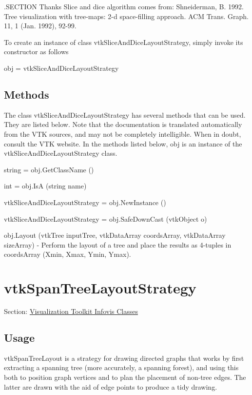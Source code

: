 .S\-E\-C\-T\-I\-O\-N Thanks Slice and dice algorithm comes from\-: Shneiderman, B. 1992. Tree visualization with tree-\/maps\-: 2-\/d space-\/filling approach. A\-C\-M Trans. Graph. 11, 1 (Jan. 1992), 92-\/99.

To create an instance of class vtk\-Slice\-And\-Dice\-Layout\-Strategy, simply invoke its constructor as follows \begin{DoxyVerb}  obj = vtkSliceAndDiceLayoutStrategy
\end{DoxyVerb}
 \hypertarget{vtkwidgets_vtkxyplotwidget_Methods}{}\subsection{Methods}\label{vtkwidgets_vtkxyplotwidget_Methods}
The class vtk\-Slice\-And\-Dice\-Layout\-Strategy has several methods that can be used. They are listed below. Note that the documentation is translated automatically from the V\-T\-K sources, and may not be completely intelligible. When in doubt, consult the V\-T\-K website. In the methods listed below, {\ttfamily obj} is an instance of the vtk\-Slice\-And\-Dice\-Layout\-Strategy class. 
\begin{DoxyItemize}
\item {\ttfamily string = obj.\-Get\-Class\-Name ()}  
\item {\ttfamily int = obj.\-Is\-A (string name)}  
\item {\ttfamily vtk\-Slice\-And\-Dice\-Layout\-Strategy = obj.\-New\-Instance ()}  
\item {\ttfamily vtk\-Slice\-And\-Dice\-Layout\-Strategy = obj.\-Safe\-Down\-Cast (vtk\-Object o)}  
\item {\ttfamily obj.\-Layout (vtk\-Tree input\-Tree, vtk\-Data\-Array coords\-Array, vtk\-Data\-Array size\-Array)} -\/ Perform the layout of a tree and place the results as 4-\/tuples in coords\-Array (Xmin, Xmax, Ymin, Ymax).  
\end{DoxyItemize}\hypertarget{vtkinfovis_vtkspantreelayoutstrategy}{}\section{vtk\-Span\-Tree\-Layout\-Strategy}\label{vtkinfovis_vtkspantreelayoutstrategy}
Section\-: \hyperlink{sec_vtkinfovis}{Visualization Toolkit Infovis Classes} \hypertarget{vtkwidgets_vtkxyplotwidget_Usage}{}\subsection{Usage}\label{vtkwidgets_vtkxyplotwidget_Usage}
vtk\-Span\-Tree\-Layout is a strategy for drawing directed graphs that works by first extracting a spanning tree (more accurately, a spanning forest), and using this both to position graph vertices and to plan the placement of non-\/tree edges. The latter are drawn with the aid of edge points to produce a tidy drawing.

